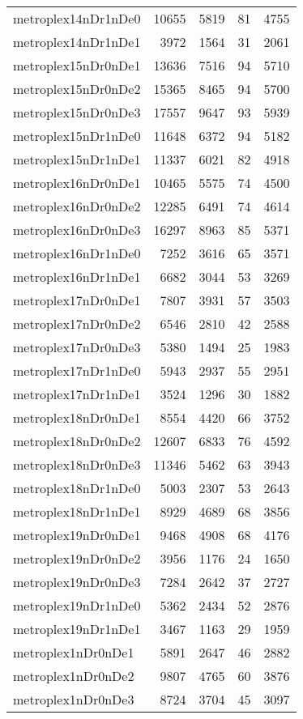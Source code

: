 \begin{longtable}{lrrrr}
metroplex14nDr1nDe0 & 10655 & 5819 & 81 & 4755 \\
metroplex14nDr1nDe1 & 3972 & 1564 & 31 & 2061 \\
metroplex15nDr0nDe1 & 13636 & 7516 & 94 & 5710 \\
metroplex15nDr0nDe2 & 15365 & 8465 & 94 & 5700 \\
metroplex15nDr0nDe3 & 17557 & 9647 & 93 & 5939 \\
metroplex15nDr1nDe0 & 11648 & 6372 & 94 & 5182 \\
metroplex15nDr1nDe1 & 11337 & 6021 & 82 & 4918 \\
metroplex16nDr0nDe1 & 10465 & 5575 & 74 & 4500 \\
metroplex16nDr0nDe2 & 12285 & 6491 & 74 & 4614 \\
metroplex16nDr0nDe3 & 16297 & 8963 & 85 & 5371 \\
metroplex16nDr1nDe0 & 7252 & 3616 & 65 & 3571 \\
metroplex16nDr1nDe1 & 6682 & 3044 & 53 & 3269 \\
metroplex17nDr0nDe1 & 7807 & 3931 & 57 & 3503 \\
metroplex17nDr0nDe2 & 6546 & 2810 & 42 & 2588 \\
metroplex17nDr0nDe3 & 5380 & 1494 & 25 & 1983 \\
metroplex17nDr1nDe0 & 5943 & 2937 & 55 & 2951 \\
metroplex17nDr1nDe1 & 3524 & 1296 & 30 & 1882 \\
metroplex18nDr0nDe1 & 8554 & 4420 & 66 & 3752 \\
metroplex18nDr0nDe2 & 12607 & 6833 & 76 & 4592 \\
metroplex18nDr0nDe3 & 11346 & 5462 & 63 & 3943 \\
metroplex18nDr1nDe0 & 5003 & 2307 & 53 & 2643 \\
metroplex18nDr1nDe1 & 8929 & 4689 & 68 & 3856 \\
metroplex19nDr0nDe1 & 9468 & 4908 & 68 & 4176 \\
metroplex19nDr0nDe2 & 3956 & 1176 & 24 & 1650 \\
metroplex19nDr0nDe3 & 7284 & 2642 & 37 & 2727 \\
metroplex19nDr1nDe0 & 5362 & 2434 & 52 & 2876 \\
metroplex19nDr1nDe1 & 3467 & 1163 & 29 & 1959 \\
metroplex1nDr0nDe1 & 5891 & 2647 & 46 & 2882 \\
metroplex1nDr0nDe2 & 9807 & 4765 & 60 & 3876 \\
metroplex1nDr0nDe3 & 8724 & 3704 & 45 & 3097 \\

\end{longtable}
